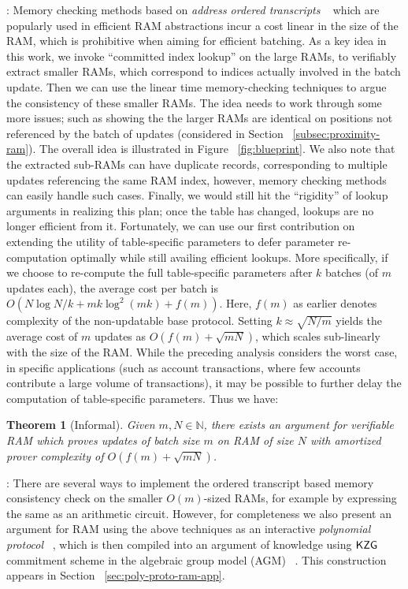 \documentclass[sigconf]{acmart}
\newtheorem{theorem}{Theorem}[section]
\begin{document}
:
Memory checking methods based on {\em address ordered transcripts}
~\cite{NDSS:WSRBW15,USENIX:BCTV14,C:BCGTV13,SP:ZGKPP18} which are popularly used in
efficient RAM abstractions incur a cost linear in the size of the RAM, which is prohibitive when
aiming for efficient batching. As a key idea in this work, we invoke ``committed index lookup'' on
the large RAMs, to verifiably extract smaller RAMs, which correspond to indices actually involved in
the batch update. Then we can use the linear time memory-checking techniques to argue the consistency of these
smaller RAMs. The idea needs to work through some more issues; such as showing the the larger RAMs are identical
on positions not referenced by the batch of updates (considered in Section ~\ref{subsec:proximity-ram}).
The overall idea is illustrated in Figure ~\ref{fig:blueprint}. We also note that the extracted sub-RAMs can
have duplicate records, corresponding to multiple updates referencing the same RAM index, however, memory
checking methods can easily handle such cases. Finally, we would still hit the ``rigidity'' of lookup arguments
in realizing this plan; once the table has changed, lookups are no longer efficient from it. Fortunately,
we can use our first contribution on extending the utility of table-specific parameters to defer parameter
re-computation optimally while still availing efficient lookups. More specifically, if we choose to
re-compute the full table-specific parameters after $k$ batches (of $m$ updates each),
the average cost per batch is $O(N\log N/k + mk\log^2(mk) + f(m))$. Here, $f(m)$ as earlier denotes complexity
of the non-updatable base protocol. Setting $k\approx \sqrt{N/m}$ yields the average cost of $m$ updates as $O(f(m)+\sqrt{mN})$,
which scales sub-linearly with the size of the RAM.
While the preceding analysis considers the worst case,
in specific applications (such as account transactions, where few accounts contribute a large volume of transactions), it may be
possible to further delay the computation of table-specific parameters.
Thus we have:
\begin{theorem}[Informal]\label{thm:inc-ver-ram-informal}
Given $m,N\in \mathbb{N}$, there exists an argument for verifiable RAM which proves updates of batch size $m$ on RAM of size $N$
with amortized prover complexity of $O(f(m) + \sqrt{mN})$.
\end{theorem}


: There are several ways to implement the ordered transcript based
memory consistency check on the smaller $O(m)$-sized RAMs, for example by expressing the same as an arithmetic
circuit. However, for completeness we also present an argument for RAM using the above techniques as an
interactive {\em polynomial protocol} ~\cite{Gabizon2019PLONKPO}, which is then compiled into an argument of knowledge using $\mathsf{KZG}$ ~\cite{AC:KatZavGol10}
commitment scheme in the algebraic group model (AGM) ~\cite{C:FucKilLos18}. This construction appears in
Section ~\ref{sec:poly-proto-ram-app}.
\end{document}
